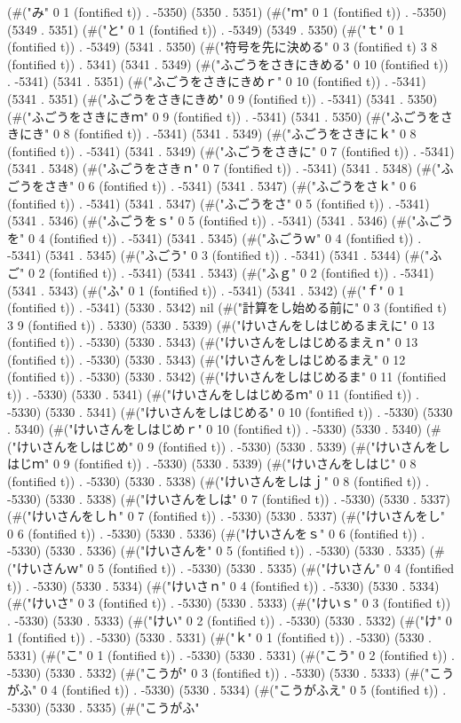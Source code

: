 {(#("み" 0 1 (fontified t)) . -5350) (5350 . 5351) (#("ｍ" 0 1 (fontified t)) . -5350) (5349 . 5351) (#("と" 0 1 (fontified t)) . -5349) (5349 . 5350) (#("ｔ" 0 1 (fontified t)) . -5349) (5341 . 5350) (#("符号を先に決める" 0 3 (fontified t) 3 8 (fontified t)) . 5341) (5341 . 5349) (#("ふごうをさきにきめる" 0 10 (fontified t)) . -5341) (5341 . 5351) (#("ふごうをさきにきめｒ" 0 10 (fontified t)) . -5341) (5341 . 5351) (#("ふごうをさきにきめ" 0 9 (fontified t)) . -5341) (5341 . 5350) (#("ふごうをさきにきｍ" 0 9 (fontified t)) . -5341) (5341 . 5350) (#("ふごうをさきにき" 0 8 (fontified t)) . -5341) (5341 . 5349) (#("ふごうをさきにｋ" 0 8 (fontified t)) . -5341) (5341 . 5349) (#("ふごうをさきに" 0 7 (fontified t)) . -5341) (5341 . 5348) (#("ふごうをさきｎ" 0 7 (fontified t)) . -5341) (5341 . 5348) (#("ふごうをさき" 0 6 (fontified t)) . -5341) (5341 . 5347) (#("ふごうをさｋ" 0 6 (fontified t)) . -5341) (5341 . 5347) (#("ふごうをさ" 0 5 (fontified t)) . -5341) (5341 . 5346) (#("ふごうをｓ" 0 5 (fontified t)) . -5341) (5341 . 5346) (#("ふごうを" 0 4 (fontified t)) . -5341) (5341 . 5345) (#("ふごうｗ" 0 4 (fontified t)) . -5341) (5341 . 5345) (#("ふごう" 0 3 (fontified t)) . -5341) (5341 . 5344) (#("ふご" 0 2 (fontified t)) . -5341) (5341 . 5343) (#("ふｇ" 0 2 (fontified t)) . -5341) (5341 . 5343) (#("ふ" 0 1 (fontified t)) . -5341) (5341 . 5342) (#("ｆ" 0 1 (fontified t)) . -5341) (5330 . 5342) nil (#("計算をし始める前に" 0 3 (fontified t) 3 9 (fontified t)) . 5330) (5330 . 5339) (#("けいさんをしはじめるまえに" 0 13 (fontified t)) . -5330) (5330 . 5343) (#("けいさんをしはじめるまえｎ" 0 13 (fontified t)) . -5330) (5330 . 5343) (#("けいさんをしはじめるまえ" 0 12 (fontified t)) . -5330) (5330 . 5342) (#("けいさんをしはじめるま" 0 11 (fontified t)) . -5330) (5330 . 5341) (#("けいさんをしはじめるｍ" 0 11 (fontified t)) . -5330) (5330 . 5341) (#("けいさんをしはじめる" 0 10 (fontified t)) . -5330) (5330 . 5340) (#("けいさんをしはじめｒ" 0 10 (fontified t)) . -5330) (5330 . 5340) (#("けいさんをしはじめ" 0 9 (fontified t)) . -5330) (5330 . 5339) (#("けいさんをしはじｍ" 0 9 (fontified t)) . -5330) (5330 . 5339) (#("けいさんをしはじ" 0 8 (fontified t)) . -5330) (5330 . 5338) (#("けいさんをしはｊ" 0 8 (fontified t)) . -5330) (5330 . 5338) (#("けいさんをしは" 0 7 (fontified t)) . -5330) (5330 . 5337) (#("けいさんをしｈ" 0 7 (fontified t)) . -5330) (5330 . 5337) (#("けいさんをし" 0 6 (fontified t)) . -5330) (5330 . 5336) (#("けいさんをｓ" 0 6 (fontified t)) . -5330) (5330 . 5336) (#("けいさんを" 0 5 (fontified t)) . -5330) (5330 . 5335) (#("けいさんｗ" 0 5 (fontified t)) . -5330) (5330 . 5335) (#("けいさん" 0 4 (fontified t)) . -5330) (5330 . 5334) (#("けいさｎ" 0 4 (fontified t)) . -5330) (5330 . 5334) (#("けいさ" 0 3 (fontified t)) . -5330) (5330 . 5333) (#("けいｓ" 0 3 (fontified t)) . -5330) (5330 . 5333) (#("けい" 0 2 (fontified t)) . -5330) (5330 . 5332) (#("け" 0 1 (fontified t)) . -5330) (5330 . 5331) (#("ｋ" 0 1 (fontified t)) . -5330) (5330 . 5331) (#("こ" 0 1 (fontified t)) . -5330) (5330 . 5331) (#("こう" 0 2 (fontified t)) . -5330) (5330 . 5332) (#("こうが" 0 3 (fontified t)) . -5330) (5330 . 5333) (#("こうがふ" 0 4 (fontified t)) . -5330) (5330 . 5334) (#("こうがふえ" 0 5 (fontified t)) . -5330) (5330 . 5335) (#("こうがふ" }
